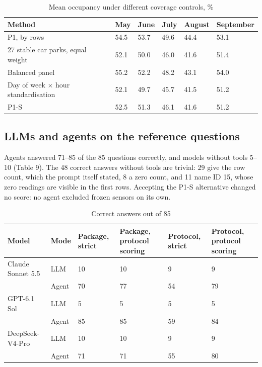 \documentclass[default]{subfiles}
\begin{document}
{\begin{table}[htbp]
  \caption{Mean occupancy under different coverage controls, \%}
  \label{tab:8}
  \centering\small
  \begin{tabular}{p{}p{}p{}p{}p{}p{}}
    \hline
    \textbf{Method} & \textbf{May} & \textbf{June} & \textbf{July} & \textbf{August} & \textbf{September} \\ \hline
    P1, by rows & 54.5 & 53.7 & 49.6 & 44.4 & 53.1 \\
    27 stable car parks, equal weight & 52.1 & 50.0 & 46.0 & 41.6 & 51.4 \\
    Balanced panel & 55.2 & 52.2 & 48.2 & 43.1 & 54.0 \\
    Day of week $\times$ hour standardisation & 52.1 & 49.7 & 45.7 & 41.5 & 51.2 \\
    P1-S & 52.5 & 51.3 & 46.1 & 41.6 & 51.2 \\
    \hline
  \end{tabular}
\end{table}

\subsection{LLMs and agents on the reference questions}

Agents answered 71--85 of the 85 questions correctly, and models without tools 5--10 (Table 9). The 48 correct answers without tools are trivial: 29 give the row count, which the prompt itself stated, 8 a zero count, and 11 name ID 15, whose zero readings are visible in the first rows. Accepting the P1-S alternative changed no score: no agent excluded frozen sensors on its own.

\begin{table}[htbp]
  \caption{Correct answers out of 85}
  \label{tab:9}
  \centering\small
  \begin{tabular}{p{}p{}p{}p{}p{}p{}}
    \hline
    \textbf{Model} & \textbf{Mode} & \textbf{Package, strict} & \textbf{Package, protocol scoring} & \textbf{Protocol, strict} & \textbf{Protocol, protocol scoring} \\ \hline
    Claude Sonnet 5.5 & LLM & 10 & 10 & 9 & 9 \\
     & Agent & 70 & 77 & 54 & 79 \\
    GPT-6.1 Sol & LLM & 5 & 5 & 5 & 5 \\
     & Agent & 85 & 85 & 59 & 84 \\
    DeepSeek-V4-Pro & LLM & 10 & 10 & 9 & 9 \\
     & Agent & 71 & 71 & 55 & 80 \\
    \hline
  \end{tabular}
\end{table}

}
\end{document}
